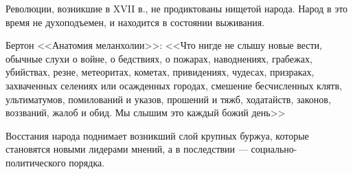 

Революции, возникшие в XVII в., не продиктованы нищетой народа. 
Народ в это время не духоподъемен, и находится в состоянии выживания. 

Бертон <<Анатомия меланхолии>>:
<<Что нигде не слышу новые вести, обычные слухи о войне, о бедствиях, о пожарах, наводнениях, грабежах, убийствах, резне, метеоритах, кометах, привидениях, чудесах,
призраках, захваченных селениях или осажденных городах, смешение бесчисленных
клятв, ультиматумов, помилований и указов, прошений и тяжб, ходатайств, законов,
воззваний, жалоб и обид. Мы слышим это каждый божий день>> 

Восстания народа поднимает возникший слой крупных буржуа, которые становятся новыми лидерами мнений, а в последствии --- социально-политического порядка.







